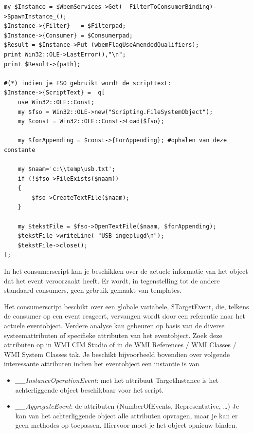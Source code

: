 \documentclass[11pt,a4paper]{report}
\begin{document}
\begin{enumerate}[resume]
\begin{lstlisting}
my $Instance = $WbemServices->Get(__FilterToConsumerBinding)->SpawnInstance_();
$Instance->{Filter}   = $Filterpad;
$Instance->{Consumer} = $Consumerpad;
$Result = $Instance->Put_(wbemFlagUseAmendedQualifiers);
print Win32::OLE->LastError(),"\n";
print $Result->{path};

#(*) indien je FSO gebruikt wordt de scripttext:
$Instance->{ScriptText} =  q[
	use Win32::OLE::Const;
	my $fso = Win32::OLE->new("Scripting.FileSystemObject");
	my $const = Win32::OLE::Const->Load($fso);
	
	my $forAppending = $const->{ForAppending}; #ophalen van deze constante
	
	my $naam='c:\\temp\usb.txt'; 
	if (!$fso->FileExists($naam))
	{
		$fso->CreateTextFile($naam);
	}
	
	my $tekstFile = $fso->OpenTextFile($naam, $forAppending);
	$tekstFile->writeLine( "USB ingeplugd\n");
	$tekstFile->close();
]; 
	\end{lstlisting}
\end{enumerate}
In het consumerscript kan je beschikken over de actuele informatie van het object dat het event veroorzaakt heeft. Er wordt, in tegenstelling tot de andere standaard consumers, geen gebruik gemaakt van templates. 
\par Het consumerscript beschikt over een globale variabele, \$TargetEvent, die, telkens de consumer op een event reageert, vervangen wordt door een referentie naar het actuele eventobject. Verdere analyse kan gebeuren op basis van de diverse systeemattributen of specifieke attributen van het eventobject. Zoek deze attributen op in WMI CIM Studio of in de WMI References / WMI Classes / WMI System Classes tak. Je beschikt bijvoorbeeld bovendien over volgende interessante attributen indien het eventobject een instantie is van
\begin{itemize}
	\item \textit{\_\_InstanceOperationEvent}: met het attribuut TargetInstance is het achterliggende object beschikbaar voor het script.
	\item \textit{\_\_AggregateEvent}: de attributen (NumberOfEvents, Representative, …)
	Je kan van het achterliggende object alle attributen opvragen, maar je kan er geen methodes op toepassen. Hiervoor moet je het object opnieuw binden.
\end{itemize}
\end{document}
